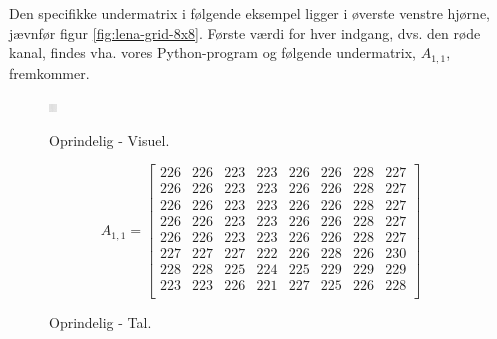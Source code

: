 Den specifikke undermatrix i følgende eksempel ligger i øverste venstre hjørne, jævnfør figur \vref{fig:lena-grid-8x8}. Første værdi for hver indgang, dvs. den røde kanal, findes vha. vores Python-program og følgende undermatrix, $A_{1,1}$, fremkommer.

\begin{figure}[!h]
\begin{minipage}[b]{0.27\linewidth}
\centering
\includegraphics[width=\textwidth]{Billeder/LenaAnvendelse/RED8x8/lena1-R8x8-org.png}
\caption{Oprindelig - Visuel.}
\label{fig:lena1-R8x8-org-visuel}
\end{minipage}
\hspace{0.5cm}
\begin{minipage}[b]{0.45\linewidth}
\centering
\[A_{1,1}=\begin{bmatrix}
226 & 226 & 223 & 223 & 226 & 226 & 228 & 227 \\
226 & 226 & 223 & 223 & 226 & 226 & 228 & 227 \\
226 & 226 & 223 & 223 & 226 & 226 & 228 & 227 \\
226 & 226 & 223 & 223 & 226 & 226 & 228 & 227 \\
226 & 226 & 223 & 223 & 226 & 226 & 228 & 227 \\
227 & 227 & 227 & 222 & 226 & 228 & 226 & 230 \\
228 & 228 & 225 & 224 & 225 & 229 & 229 & 229 \\
223 & 223 & 226 & 221 & 227 & 225 & 226 & 228 \\
\end{bmatrix}\]
\caption{Oprindelig - Tal.}
\label{fig:lena1-R8x8-org-matrix}
\end{minipage}
\end{figure}

